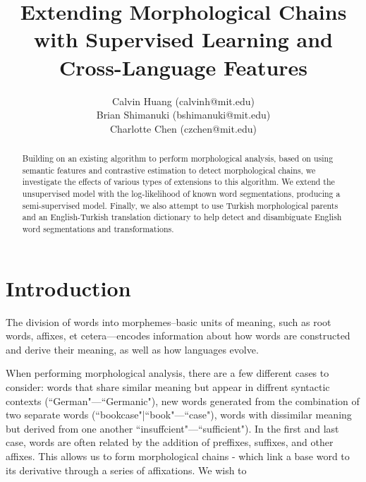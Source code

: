 \documentclass[11pt,twocolumn]{article}
\begin{document}
 
\title{Extending Morphological Chains with Supervised Learning and Cross-Language Features}

\author{Calvin Huang (calvinh@mit.edu)\\
    Brian Shimanuki (bshimanuki@mit.edu)\\
    Charlotte Chen (czchen@mit.edu)
\\
}

\maketitle
\thispagestyle{empty}

\begin{abstract}
    Building on an existing algorithm to perform morphological analysis,
    based on using semantic features and contrastive estimation to detect morphological chains,
    we investigate the effects of various types of extensions to this algorithm.
    We extend the unsupervised model with the log-likelihood of known word segmentations,
    producing a semi-supervised model.
    Finally, we also attempt to use Turkish morphological parents and an English-Turkish translation
    dictionary to help detect and disambiguate English word segmentations and transformations.
\end{abstract}

\section{Introduction}
The division of words into morphemes--basic units of meaning, such as root words,
affixes, et cetera---encodes information about how words are constructed and derive their meaning,
as well as how languages evolve.

When performing morphological analysis, there are a few different cases to consider: words that share similar
meaning but appear in diffrent syntactic contexts (``German"---``Germanic"), new words generated from
the combination of two separate words (``bookcase"|``book"---``case"), words with dissimilar meaning but
derived from one another ``insuffcient"---``sufficient"). In the first and last case, words are often related
by the addition of preffixes, suffixes, and other affixes. This allows us to form morphological chains - which
link a base word to its derivative through a series of affixations.
We wish to 

\end{document}

